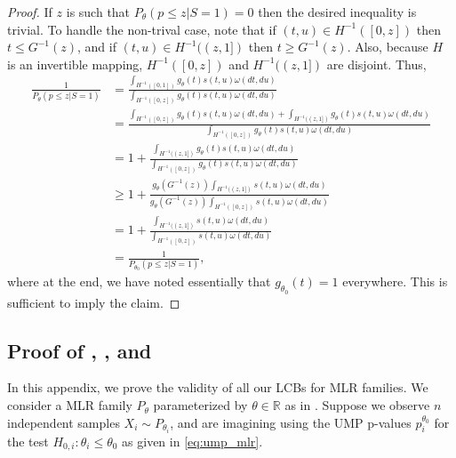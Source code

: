 \documentclass{article}
\newcommand{\R}{\mathbb{R}}
\begin{document}
\begin{appendix}
\begin{proof}
If $z$ is such that $P_{\theta}(p \leq z | S = 1)  = 0$ then the desired inequality is trivial. To handle the non-trival case, note that if $(t, u) \in H^{-1}([0, z])$ then $t \leq G^{-1}(z)$, and if $(t, u) \in H^{-1}((z, 1])$ then $t \geq G^{-1}(z)$. Also, because $H$ is an invertible mapping, $H^{-1}([0, z])$ and $H^{-1}((z, 1])$ are disjoint. Thus, 
\begin{align*}
     \frac{1}{P_{\theta}(p \leq z | S = 1)} &= \frac{\int_{H^{-1}([0, 1])} g_{\theta}(t) s(t, u) \omega(dt, du) }{\int_{H^{-1}([0, z])} g_{\theta}(t) s(t, u) \omega(dt, du) }\\
                                            &= \frac{\int_{H^{-1}([0, z])} g_{\theta}(t) s(t, u) \omega(dt, du) + \int_{H^{-1}((z, 1])} g_{\theta}(t)  s(t, u)\omega(dt, du) }{\int_{H^{-1}([0, z])} g_{\theta}(t) s(t, u) \omega(dt, du) }\\
                                            &= 1 + \frac{\int_{H^{-1}((z, 1])} g_{\theta}(t) s(t, u) \omega(dt, du)}{\int_{H^{-1}([0, z])} g_{\theta}(t) s(t, u) \omega(dt, du)}\\
                                            &\geq 1 + \frac{g_{\theta}(G^{-1}(z))  \int_{H^{-1}((z, 1])}  s(t, u) \omega(dt, du)}{g_{\theta}(G^{-1}(z)) \int_{H^{-1}([0, z])} s(t, u) \omega(dt, du)} \\
                                            &= 1 + \frac{\int_{H^{-1}((z, 1])} s(t, u) \omega(dt, du)}{ \int_{H^{-1}([0, z])} s(t, u) \omega(dt, du)} \\
                                            &= \frac{1}{P_{\theta_0}(p \leq z | S = 1)}, 
\end{align*}
where at the end, we have noted essentially that $g_{\theta_0}(t) = 1$ everywhere. This is sufficient to imply the claim. 
\end{proof}

\subsection{Proof of , , and }

In this appendix, we prove the validity of all our LCBs for MLR families. We consider a MLR family  $P_{\theta}$ parameterized by $\theta \in \R$ as in . Suppose we observe $n$ independent samples $X_i \sim P_{\theta_i}$, and are imagining using the UMP p-values $p_i^{\theta_0}$ for the test $H_{0, i} : \theta_i \leq \theta_0$ as given in \eqref{eq:ump_mlr}.


\end{appendix}
\end{document}

